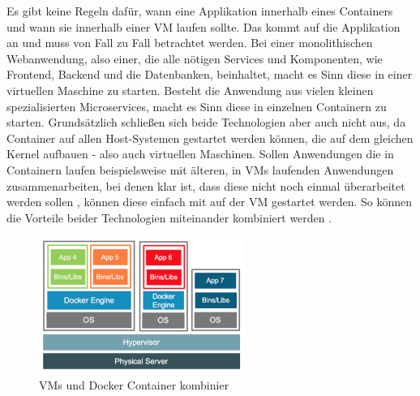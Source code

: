 \noindent Es gibt keine Regeln dafür, wann eine Applikation innerhalb eines Containers und wann sie innerhalb einer VM laufen sollte. Das kommt auf die Applikation an und muss von Fall zu Fall betrachtet werden. Bei einer monolithischen Webanwendung, also einer, die alle nötigen Services und Komponenten, wie Frontend, Backend und die Datenbanken, beinhaltet, macht es Sinn diese in einer virtuellen Maschine zu starten. Besteht die Anwendung aus vielen kleinen spezialisierten Microservices, macht es Sinn diese in einzelnen Containern zu starten. Grundsätzlich schließen sich beide Technologien aber auch nicht aus, da Container auf allen Host-Systemen gestartet werden können, die auf dem gleichen Kernel aufbauen - also auch virtuellen Maschinen. Sollen Anwendungen die in Containern laufen beispielsweise mit älteren, in VMs laufenden Anwendungen zusammenarbeiten, bei denen klar ist, dass diese nicht noch einmal überarbeitet werden sollen , können diese einfach mit auf der VM gestartet werden. So können die Vorteile beider Technologien miteinander kombiniert werden \cite{docker:cavm}.\\

\begin{figure}[!ht]
  \centering
  \includegraphics[width=0.6\textwidth]{images/7-container-vm-combined.jpg}
  \caption{VMs und Docker Container kombinier \cite{docker:cavm}}
\end{figure}
